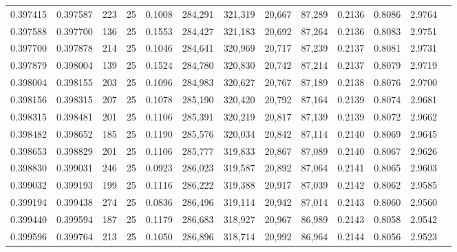 \begin{tabular}{rrrrrrrrrrrrr}
0.397415 & 0.397587 &   223 &  25 &                                     0.1008 & 284,291 & 321,319 &  20,667 &  87,289 & 0.2136 & 0.8086 & 2.9764 \\
0.397588 & 0.397700 &   136 &  25 &                                     0.1553 & 284,427 & 321,183 &  20,692 &  87,264 & 0.2136 & 0.8083 & 2.9751 \\
0.397700 & 0.397878 &   214 &  25 &                                     0.1046 & 284,641 & 320,969 &  20,717 &  87,239 & 0.2137 & 0.8081 & 2.9731 \\
0.397879 & 0.398004 &   139 &  25 &                                     0.1524 & 284,780 & 320,830 &  20,742 &  87,214 & 0.2137 & 0.8079 & 2.9719 \\
0.398004 & 0.398155 &   203 &  25 &                                     0.1096 & 284,983 & 320,627 &  20,767 &  87,189 & 0.2138 & 0.8076 & 2.9700 \\
0.398156 & 0.398315 &   207 &  25 &                                     0.1078 & 285,190 & 320,420 &  20,792 &  87,164 & 0.2139 & 0.8074 & 2.9681 \\
0.398315 & 0.398481 &   201 &  25 &                                     0.1106 & 285,391 & 320,219 &  20,817 &  87,139 & 0.2139 & 0.8072 & 2.9662 \\
0.398482 & 0.398652 &   185 &  25 &                                     0.1190 & 285,576 & 320,034 &  20,842 &  87,114 & 0.2140 & 0.8069 & 2.9645 \\
0.398653 & 0.398829 &   201 &  25 &                                     0.1106 & 285,777 & 319,833 &  20,867 &  87,089 & 0.2140 & 0.8067 & 2.9626 \\
0.398830 & 0.399031 &   246 &  25 &                                     0.0923 & 286,023 & 319,587 &  20,892 &  87,064 & 0.2141 & 0.8065 & 2.9603 \\
0.399032 & 0.399193 &   199 &  25 &                                     0.1116 & 286,222 & 319,388 &  20,917 &  87,039 & 0.2142 & 0.8062 & 2.9585 \\
0.399194 & 0.399438 &   274 &  25 &                                     0.0836 & 286,496 & 319,114 &  20,942 &  87,014 & 0.2143 & 0.8060 & 2.9560 \\
0.399440 & 0.399594 &   187 &  25 &                                     0.1179 & 286,683 & 318,927 &  20,967 &  86,989 & 0.2143 & 0.8058 & 2.9542 \\
0.399596 & 0.399764 &   213 &  25 &                                     0.1050 & 286,896 & 318,714 &  20,992 &  86,964 & 0.2144 & 0.8056 & 2.9523 \\

\end{tabular}
